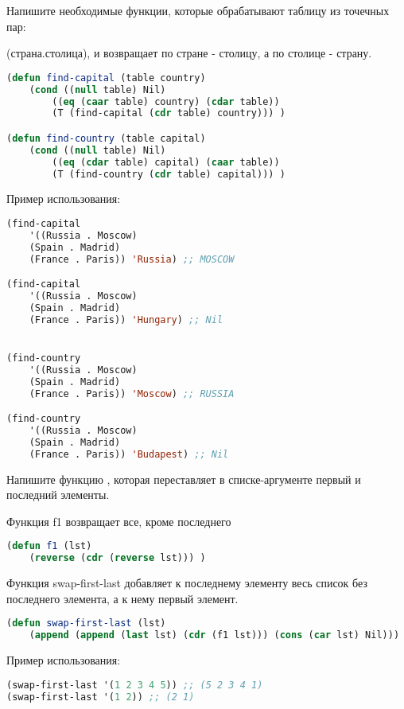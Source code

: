 \documentclass[a4paper,oneside,12pt]{extreport}
\begin{document}
\begin{task}
    Напишите необходимые функции, которые обрабатывают таблицу из точечных пар:
    
    (страна.столица), и возвращает по стране - столицу, а по столице - страну.
    \begin{lstlisting}[language=Lisp]
(defun find-capital (table country)
    (cond ((null table) Nil)
        ((eq (caar table) country) (cdar table)) 
        (T (find-capital (cdr table) country))) )

(defun find-country (table capital)
    (cond ((null table) Nil)
        ((eq (cdar table) capital) (caar table)) 
        (T (find-country (cdr table) capital))) )
    \end{lstlisting}

    Пример использования:
    \begin{lstlisting}[language=Lisp]
(find-capital 
    '((Russia . Moscow)
    (Spain . Madrid)
    (France . Paris)) 'Russia) ;; MOSCOW

(find-capital 
    '((Russia . Moscow)
    (Spain . Madrid)
    (France . Paris)) 'Hungary) ;; Nil


(find-country
    '((Russia . Moscow)
    (Spain . Madrid)
    (France . Paris)) 'Moscow) ;; RUSSIA

(find-country
    '((Russia . Moscow)
    (Spain . Madrid)
    (France . Paris)) 'Budapest) ;; Nil
    \end{lstlisting}

\end{task}

\begin{task}
	Напишите функцию , которая
    переставляет в списке-аргументе первый и последний элементы.
    
    Функция f1 возвращает все, кроме последнего
    \begin{lstlisting}[language=Lisp]
(defun f1 (lst)
    (reverse (cdr (reverse lst))) )
    \end{lstlisting}
    
    Функция swap-first-last добавляет к последнему элементу весь список 
    без последнего элемента, а к нему первый элемент.
    \begin{lstlisting}[language=Lisp]
(defun swap-first-last (lst)
    (append (append (last lst) (cdr (f1 lst))) (cons (car lst) Nil)))
    \end{lstlisting}

    Пример использования:
    \begin{lstlisting}[language=Lisp]
(swap-first-last '(1 2 3 4 5)) ;; (5 2 3 4 1)
(swap-first-last '(1 2)) ;; (2 1)
    \end{lstlisting}

\end{task}
\end{document}
